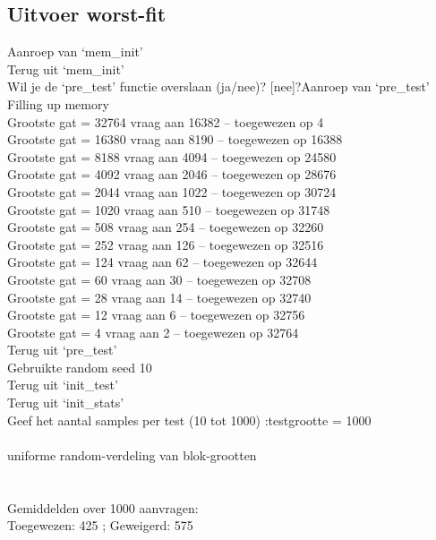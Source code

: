 \documentclass[a4paper]{article}
\begin{document}
		\subsection{Uitvoer worst-fit}\label{sec:uitvoerwf}
			Aanroep van `mem\_init'\\
			Terug uit `mem\_init'\\
			Wil je de `pre\_test' functie overslaan (ja/nee)? [nee]?Aanroep van `pre\_test'\\
			Filling up memory\\
			Grootste gat = 32764	 vraag aan 16382 -- toegewezen op 4\\
			Grootste gat = 16380	 vraag aan 8190 -- toegewezen op 16388\\
			Grootste gat = 8188	 vraag aan 4094 -- toegewezen op 24580\\
			Grootste gat = 4092	 vraag aan 2046 -- toegewezen op 28676\\
			Grootste gat = 2044	 vraag aan 1022 -- toegewezen op 30724\\
			Grootste gat = 1020	 vraag aan 510 -- toegewezen op 31748\\
			Grootste gat = 508	 vraag aan 254 -- toegewezen op 32260\\
			Grootste gat = 252	 vraag aan 126 -- toegewezen op 32516\\
			Grootste gat = 124	 vraag aan 62 -- toegewezen op 32644\\
			Grootste gat = 60	 vraag aan 30 -- toegewezen op 32708\\
			Grootste gat = 28	 vraag aan 14 -- toegewezen op 32740\\
			Grootste gat = 12	 vraag aan 6 -- toegewezen op 32756\\
			Grootste gat = 4	 vraag aan 2 -- toegewezen op 32764\\
			Terug uit `pre\_test'\\
			Gebruikte random seed 10\\
			Terug uit `init\_test'\\
			Terug uit `init\_stats'\\
			Geef het aantal samples per test (10 tot 1000) :testgrootte = 1000\\
			\\
			uniforme random-verdeling van blok-grootten\\
			\\
			\\
			Gemiddelden over 1000 aanvragen:\\
			Toegewezen: 425 ; Geweigerd: 575\\
\end{document}
